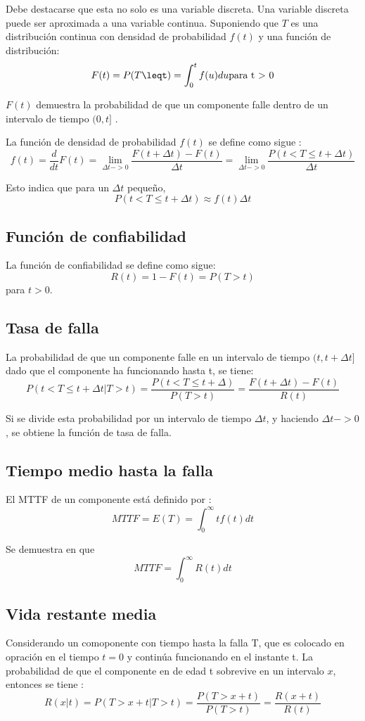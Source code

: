 Debe destacarse que esta no solo es una variable discreta. Una variable discreta puede ser aproximada a una variable continua. Suponiendo que $T$ es una distribución continua con densidad de probabilidad $f(t)$ y una función de distribución: $$F(t) = P(T\leqt) = \int_0^t f(u)du \text{para t > 0}$$

$F(t)$ demuestra la probabilidad de que un componente falle dentro de un intervalo de tiempo $(0,t]$ \citep{Rausand04}.

La función de densidad de probabilidad $f(t)$ se define como sigue \citep{Rausand04}: $$f(t) = \frac{d}{dt}F(t) = \lim_{\Delta t->0}\frac{F(t+\Delta t) - F(t)}{\Delta t} = \lim_{\Delta t ->0} \frac{P(t<T\leq t + \Delta t)}{\Delta t}$$

Esto indica que para un $\Delta t$ pequeño, $$P(t < T \leq t + \Delta t) \approx f(t)\Delta t$$

\subsection{Función de confiabilidad}
La función de confiabilidad se define como sigue: $$R(t) =  1 - F(t) = P(T>t)$$ para $t>0$.

\subsection{Tasa de falla}
La probabilidad de que un componente falle en un intervalo de tiempo $(t, t+\Delta t]$ dado que el componente ha funcionando hasta t, se tiene: $$P(t < T \leq t + \Delta t | T > t) = \frac{P(t< T \leq t+\Delta)}{P(T>t)} = \frac{F(t+\Delta t) - F(t)}{R(t)}$$

Si se divide esta probabilidad por un intervalo de tiempo $\Delta t$, y haciendo $\Delta t -> 0$, se obtiene la función de tasa de falla.

\subsection{Tiempo medio hasta la falla}
El \ac{MTTF} de un componente está definido por \citep{FTDesign} \cite{Rausand04}: $$MTTF = E(T) = \int_0^\infty tf(t)dt$$

Se demuestra en \cite{Rausand04} que $$MTTF = \int_0^\infty R(t)dt$$

\subsection{Vida restante media}
Considerando un comoponente con tiempo hasta la falla T, que es colocado en opración en el tiempo $t = 0$ y continúa funcionando en el instante t. La probabilidad de que el componente en de edad t sobrevive en un intervalo $x$, entonces se tiene \citep{Rausand04}: $$R(x|t) = P(T>x+t | T>t) = \frac{P(T>x+t)}{P(T>t)} = \frac{R(x+t)}{R(t)}$$

